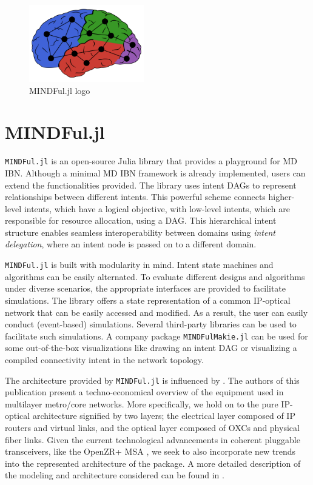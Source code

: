 \documentclass{juliacon}
\begin{document}
    \begin{figure}[b]
    \centerline{\includegraphics[width=5cm]{logo.pdf}}
    \caption{MINDFul.jl logo}
        \label{fig:logo}
    \end{figure}

\section{MINDFul.jl}
\verb|MINDFul.jl| is an open-source Julia library that provides a playground for \ac{MD} \ac{IBN}.
Although a minimal \ac{MD} \ac{IBN} framework is already implemented, users can extend the functionalities provided.
The library uses intent \acp{DAG} \cite{2023ChristouITG} to represent relationships between different intents.
This powerful scheme connects higher-level intents, which have a logical objective, with low-level intents, which are responsible for resource allocation, using a \ac{DAG}.
This hierarchical intent structure enables seamless interoperability between domains using \emph{intent delegation}, where an intent node is passed on to a different domain.

\verb|MINDFul.jl| is built with modularity in mind.
Intent state machines and algorithms can be easily alternated.
To evaluate different designs and algorithms under diverse scenarios, the appropriate interfaces are provided to facilitate simulations. 
The library offers a state representation of a common IP-optical network \linebreak that can be easily accessed and modified. 
As a result, the user can easily conduct (event-based) simulations.
Several third-party libraries can be used to facilitate such simulations.
A company package \verb|MINDFulMakie.jl| can be used for some out-of-the-box visualizations like drawing an intent \ac{DAG} or visualizing a compiled connectivity intent in the network topology.

The architecture provided by \verb|MINDFul.jl| is influenced by \cite{2013Rambach}.
The authors of this publication present a techno-economical overview of the equipment used in multilayer metro/core networks.
More specifically, we hold on to the pure IP-optical architecture signified by two layers; the electrical layer composed of IP routers and virtual links, and the optical layer composed of \acp{OXC} and physical fiber links.
Given the current technological advancements in coherent pluggable transceivers, like the OpenZR+ \ac{MSA} \cite{OpenZRProps}, we seek to also incorporate new trends into the represented architecture of the package.
A more detailed description of the modeling and architecture considered can be found in \cite{2022ChristouPlug}.
\end{document}
